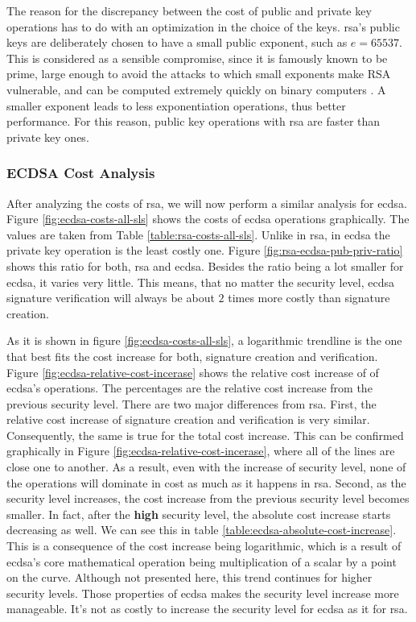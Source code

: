 \documentclass{llncs}
\begin{document}
The reason for the discrepancy between the cost of public and private key operations has to do with an optimization
in the choice of the keys. \gls{rsa}'s public keys are deliberately chosen to have a small public exponent, such as $e=65537$. This is considered as a
sensible compromise, since it is famously known to be prime, large enough to avoid the attacks to which
small exponents make RSA vulnerable, and can be computed extremely quickly on binary computers \cite{boneh2002fast}\cite{muir2006seifert}.
A smaller exponent leads to less exponentiation operations, thus better performance. For this reason, public
key operations with \gls{rsa} are faster than private key ones.

\subsubsection{ECDSA Cost Analysis}

After analyzing the costs of \gls{rsa}, we will now perform a similar analysis for \gls{ecdsa}. Figure \ref{fig:ecdsa-costs-all-sls}
shows the costs of \gls{ecdsa} operations graphically. The values are taken from Table \ref{table:rsa-costs-all-sls}. Unlike in \gls{rsa},
in \gls{ecdsa} the private key operation is the least costly one. Figure \ref{fig:rsa-ecdsa-pub-priv-ratio} shows this ratio for both,
\gls{rsa} and \gls{ecdsa}. Besides the ratio being a lot smaller for \gls{ecdsa}, it varies very little. This means, that no matter
the security level, \gls{ecdsa} signature verification will always be about $2$ times more costly than signature creation.

As it is shown in figure \ref{fig:ecdsa-costs-all-sls}, a logarithmic trendline is the one that best fits the cost increase for both,
signature creation and verification.
Figure \ref{fig:ecdsa-relative-cost-incerase} shows the relative cost increase of of \gls{ecdsa}'s operations. The percentages
are the relative cost increase from the previous security level. There are two major differences from \gls{rsa}. First, the relative cost increase
of signature creation and verification is very similar. Consequently, the same is true for the total cost increase. This can be confirmed
graphically in Figure \ref{fig:ecdsa-relative-cost-incerase}, where all of the lines are
close one to another. As a result, even with the increase of security level, none of the operations will dominate in cost as much as it happens
in \gls{rsa}. Second, as the security level increases, the cost increase from the previous security level becomes smaller. In fact, after the
\textbf{high} security level, the absolute cost increase starts decreasing as well. We can see this in table \ref{table:ecdsa-absolute-cost-increase}.
This is a consequence of the cost increase being logarithmic, which is a result of \gls{ecdsa}'s core mathematical operation being
multiplication of a scalar by a point on the curve. Although not presented here, this trend continues for higher security levels.
Those properties of \gls{ecdsa} makes the security level increase more manageable. It's not as costly to increase the security level for
\gls{ecdsa} as it for \gls{rsa}.
\end{document}
